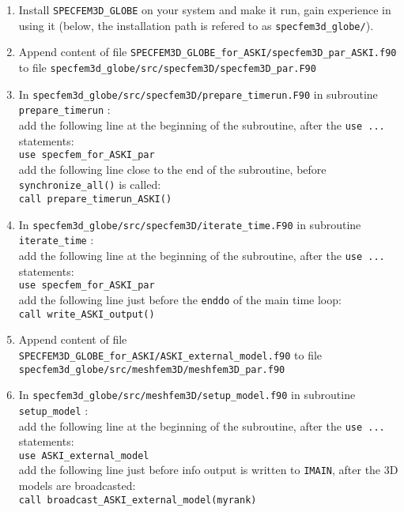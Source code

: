 \documentclass[12pt,a4paper]{article}
\newcommand{\lcode}[1]{\nolinkurl{#1}}
\begin{document}
\begin{enumerate}
\item Install \lcode{SPECFEM3D_GLOBE} on your system and make it run, gain 
   experience in using it (below, the installation path is refered to as 
   \lcode{specfem3d_globe/}).

 \item Append content of file \lcode{SPECFEM3D_GLOBE_for_ASKI/specfem3D_par_ASKI.f90} to file
   \lcode{specfem3d_globe/src/specfem3D/specfem3D_par.F90}

 \item In \lcode{specfem3d_globe/src/specfem3D/prepare_timerun.F90} in subroutine \lcode{prepare_timerun} :\\
   add the following line at the beginning of the subroutine, after the \lcode{use ...} statements:\\
   \lcode{use specfem_for_ASKI_par}\\
   add the following line close to the end of the subroutine, before \lcode{synchronize_all()} is called:\\
   \lcode{call prepare_timerun_ASKI()}

 \item In \lcode{specfem3d_globe/src/specfem3D/iterate_time.F90} in subroutine \lcode{iterate_time} :\\
   add the following line at the beginning of the subroutine, after the \lcode{use ...} statements:\\
   \lcode{use specfem_for_ASKI_par}\\
   add the following line just before the \lcode{enddo} of the main time loop:\\
   \lcode{call write_ASKI_output()}

 \item Append content of file \lcode{SPECFEM3D_GLOBE_for_ASKI/ASKI_external_model.f90} to file
   \lcode{specfem3d_globe/src/meshfem3D/meshfem3D_par.f90}

 \item In \lcode{specfem3d_globe/src/meshfem3D/setup_model.f90} in subroutine \lcode{setup_model} : \\
   add the following line at the beginning of the subroutine, after the \lcode{use ...} statements:\\
   \lcode{use ASKI_external_model}\\
   add the following line just before info output is written to \lcode{IMAIN}, after the 3D models are broadcasted:\\
   \lcode{call broadcast_ASKI_external_model(myrank)}


\end{enumerate}
\end{document}
